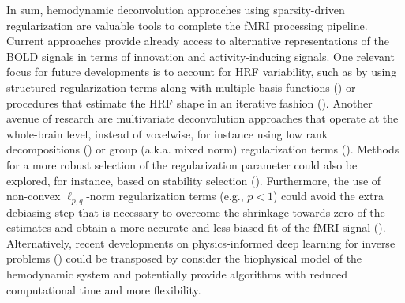 In sum, hemodynamic deconvolution approaches using sparsity-driven regularization are valuable tools to complete the fMRI processing pipeline. Current approaches provide already access to alternative representations of the BOLD signals in terms of innovation and activity-inducing signals. One relevant focus for future developments is to account for HRF variability, such as by using structured regularization terms along with multiple basis functions (\citealt{Gaudes2012Structuredsparsedeconvolution}) or procedures that estimate the HRF shape in an iterative fashion (\citealt{Farouj2019BoldSignalDeconvolution,cherkaoui:hal-03005584}). Another avenue of research are multivariate deconvolution approaches that operate at the whole-brain level, instead of voxelwise, for instance using low rank decompositions (\citealt{cherkaoui:hal-03005584, Urunuela_2021}) or group (a.k.a. mixed norm) regularization terms (\citealt{urunuela-tremino_2019}). Methods for a more robust selection of the regularization parameter could also be explored, for instance, based on stability selection (\citealt{Meinshausen2010Stabilityselection,Urunuela2020StabilityBasedSparse}). Furthermore, the use of non-convex \(\ell_{p,q}\)-norm regularization terms (e.g., \(p < 1\)) could avoid the extra debiasing step that is necessary to overcome the shrinkage towards zero of the estimates and obtain a more accurate and less biased fit of the fMRI signal  (\citealt{Gaudes2013Paradigmfreemapping,CaballeroGaudes2019deconvolutionalgorithmmulti}). Alternatively, recent developments on physics-informed deep learning for inverse problems (\citealt{Akcakaya2021,Monga2021,Ongie2020}) could be transposed by consider the biophysical model of the hemodynamic system and potentially provide algorithms with reduced computational time and more flexibility. 